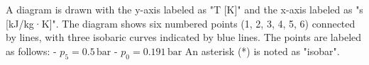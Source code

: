 A diagram is drawn with the y-axis labeled as "T [K]" and the x-axis labeled as "s [kJ/kg·K]". The diagram shows six numbered points (1, 2, 3, 4, 5, 6) connected by lines, with three isobaric curves indicated by blue lines. The points are labeled as follows:  
- \( p_5 = 0.5 \, \text{bar} \)  
- \( p_0 = 0.191 \, \text{bar} \)  
An asterisk (*) is noted as "isobar".